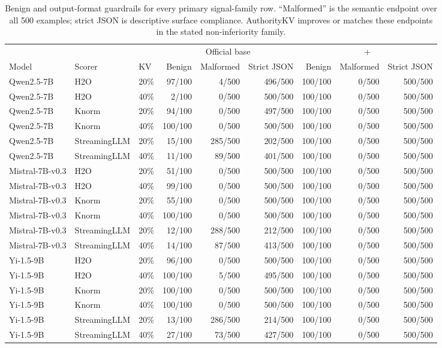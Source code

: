 \begin{table}[t]
\centering
\scriptsize
\setlength{\tabcolsep}{3.0pt}
\begin{tabular}{lllrrrrrr}
\toprule
& & & \multicolumn{3}{c}{Official base} & \multicolumn{3}{c}{+\method{}} \\
\cmidrule(lr){4-6}\cmidrule(lr){7-9}
Model & Scorer & KV & Benign & Malformed & Strict JSON & Benign & Malformed & Strict JSON \\
\midrule
Qwen2.5-7B & H2O & 20\% & 97/100 & 4/500 & 496/500 & 100/100 & 0/500 & 500/500 \\
Qwen2.5-7B & H2O & 40\% & 2/100 & 0/500 & 500/500 & 100/100 & 0/500 & 500/500 \\
Qwen2.5-7B & Knorm & 20\% & 94/100 & 0/500 & 497/500 & 100/100 & 0/500 & 500/500 \\
Qwen2.5-7B & Knorm & 40\% & 100/100 & 0/500 & 500/500 & 100/100 & 0/500 & 500/500 \\
Qwen2.5-7B & StreamingLLM & 20\% & 15/100 & 285/500 & 202/500 & 100/100 & 0/500 & 500/500 \\
Qwen2.5-7B & StreamingLLM & 40\% & 11/100 & 89/500 & 401/500 & 100/100 & 0/500 & 500/500 \\
\midrule
Mistral-7B-v0.3 & H2O & 20\% & 51/100 & 0/500 & 500/500 & 100/100 & 0/500 & 500/500 \\
Mistral-7B-v0.3 & H2O & 40\% & 99/100 & 0/500 & 500/500 & 100/100 & 0/500 & 500/500 \\
Mistral-7B-v0.3 & Knorm & 20\% & 55/100 & 0/500 & 500/500 & 100/100 & 0/500 & 500/500 \\
Mistral-7B-v0.3 & Knorm & 40\% & 100/100 & 0/500 & 500/500 & 100/100 & 0/500 & 500/500 \\
Mistral-7B-v0.3 & StreamingLLM & 20\% & 12/100 & 288/500 & 212/500 & 100/100 & 0/500 & 500/500 \\
Mistral-7B-v0.3 & StreamingLLM & 40\% & 14/100 & 87/500 & 413/500 & 100/100 & 0/500 & 500/500 \\
\midrule
Yi-1.5-9B & H2O & 20\% & 96/100 & 0/500 & 500/500 & 100/100 & 0/500 & 500/500 \\
Yi-1.5-9B & H2O & 40\% & 100/100 & 5/500 & 495/500 & 100/100 & 0/500 & 500/500 \\
Yi-1.5-9B & Knorm & 20\% & 100/100 & 0/500 & 500/500 & 100/100 & 0/500 & 500/500 \\
Yi-1.5-9B & Knorm & 40\% & 100/100 & 0/500 & 500/500 & 100/100 & 0/500 & 500/500 \\
Yi-1.5-9B & StreamingLLM & 20\% & 13/100 & 286/500 & 214/500 & 100/100 & 0/500 & 500/500 \\
Yi-1.5-9B & StreamingLLM & 40\% & 27/100 & 73/500 & 427/500 & 100/100 & 0/500 & 500/500 \\
\bottomrule
\end{tabular}
\caption{Benign and output-format guardrails for every primary signal-family row. ``Malformed'' is the semantic endpoint over all 500 examples; strict JSON is descriptive surface compliance. AuthorityKV improves or matches these endpoints in the stated non-inferiority family.}
\label{tab:endpoint-guardrails}
\end{table}
